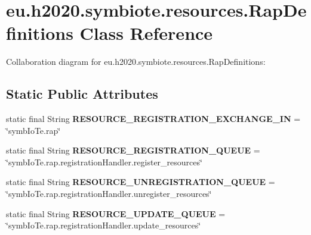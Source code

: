 \hypertarget{classeu_1_1h2020_1_1symbiote_1_1resources_1_1RapDefinitions}{}\section{eu.\+h2020.\+symbiote.\+resources.\+Rap\+Definitions Class Reference}
\label{classeu_1_1h2020_1_1symbiote_1_1resources_1_1RapDefinitions}


Collaboration diagram for eu.\+h2020.\+symbiote.\+resources.\+Rap\+Definitions\+:
\subsection*{Static Public Attributes}
\begin{DoxyCompactItemize}
\item 
\mbox{\label{classeu_1_1h2020_1_1symbiote_1_1resources_1_1RapDefinitions_abf5b859b067d93b4200c2de656d58929}} 
static final String {\bfseries R\+E\+S\+O\+U\+R\+C\+E\+\_\+\+R\+E\+G\+I\+S\+T\+R\+A\+T\+I\+O\+N\+\_\+\+E\+X\+C\+H\+A\+N\+G\+E\+\_\+\+IN} = \char`\"{}symb\+Io\+Te.\+rap\char`\"{}
\item 
\mbox{\label{classeu_1_1h2020_1_1symbiote_1_1resources_1_1RapDefinitions_a173fc33f5a778894aa9c50fc87a1b7fb}} 
static final String {\bfseries R\+E\+S\+O\+U\+R\+C\+E\+\_\+\+R\+E\+G\+I\+S\+T\+R\+A\+T\+I\+O\+N\+\_\+\+Q\+U\+E\+UE} = \char`\"{}symb\+Io\+Te.\+rap.\+registration\+Handler.\+register\+\_\+resources\char`\"{}
\item 
\mbox{\label{classeu_1_1h2020_1_1symbiote_1_1resources_1_1RapDefinitions_a06147f3944036ff89bd18de24bb23bd7}} 
static final String {\bfseries R\+E\+S\+O\+U\+R\+C\+E\+\_\+\+U\+N\+R\+E\+G\+I\+S\+T\+R\+A\+T\+I\+O\+N\+\_\+\+Q\+U\+E\+UE} = \char`\"{}symb\+Io\+Te.\+rap.\+registration\+Handler.\+unregister\+\_\+resources\char`\"{}
\item 
\mbox{\label{classeu_1_1h2020_1_1symbiote_1_1resources_1_1RapDefinitions_ad2d6b53ffdc65836170d3adfa8e4897a}} 
static final String {\bfseries R\+E\+S\+O\+U\+R\+C\+E\+\_\+\+U\+P\+D\+A\+T\+E\+\_\+\+Q\+U\+E\+UE} = \char`\"{}symb\+Io\+Te.\+rap.\+registration\+Handler.\+update\+\_\+resources\char`\"{}

\end{DoxyCompactItemize}
